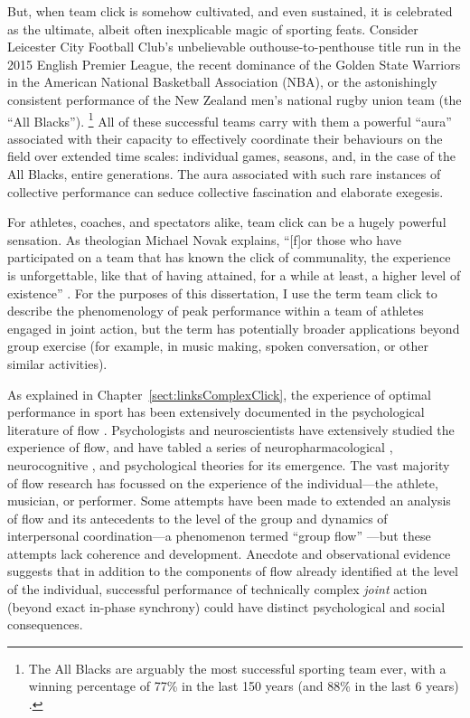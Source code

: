 \begin{CJK}{UTF8}{gbsn}
But, when team click is somehow cultivated, and even sustained, it is celebrated as the ultimate, albeit often inexplicable magic of sporting feats. Consider Leicester City Football Club's unbelievable outhouse-to-penthouse title run in the 2015 English Premier League, the recent dominance of the Golden State Warriors in the American National Basketball Association (NBA), or the astonishingly consistent performance of the New Zealand men's national rugby union team (the ``All Blacks'').
    \footnote{The All Blacks are arguably the most successful sporting team ever, with a winning percentage of 77\% in the last 150 years (and 88\% in the last 6 years) \citep{Kerr2013}.}
All of these successful teams carry with them a powerful ``aura'' associated with their capacity to effectively coordinate their behaviours on the field over extended time scales: individual games, seasons, and, in the case of the All Blacks, entire generations.  The aura associated with such rare instances of collective performance can seduce collective fascination and elaborate exegesis.


For athletes, coaches, and spectators alike, team click can be a hugely powerful sensation.  As theologian Michael Novak explains, ``[f]or those who have participated on a team that has known the click of communality, the experience is unforgettable, like that of having attained, for a while at least, a higher level of existence'' \citep[11]{White2011}. For the purposes of this dissertation, I use the term team click to describe the phenomenology of peak performance within a team of athletes engaged in joint action, but the term has potentially broader applications beyond group exercise (for example, in music making, spoken conversation, or other similar activities).

As explained in Chapter~\ref{sect:linksComplexClick}, the experience of optimal performance in sport has been extensively documented in the psychological literature of flow \citep{Csikszentmihalyi1992,Jackson1995,Jackson1999,McNeill1995}.  Psychologists and neuroscientists have extensively studied the experience of flow, and have tabled a series of neuropharmacological \citep{Boecker2008}, neurocognitive \citep{Dietrich2006,Dietrich2011,Labelle2013}, and psychological \citep{Csikszentmihalyi1992} theories for its emergence.  The vast majority of flow research has focussed on the experience of the individual---the athlete, musician, or performer.  Some attempts have been made to extended an analysis of flow and its antecedents to the level of the group and dynamics of interpersonal coordination---a phenomenon termed ``group flow'' \citep{Sawyer2006}---but these attempts lack coherence and development.  Anecdote and observational evidence suggests that in addition to the components of flow already identified at the level of the individual, successful performance of technically complex
\textit{joint} action (beyond exact in-phase synchrony) could have distinct psychological and social consequences.


\end{CJK}
